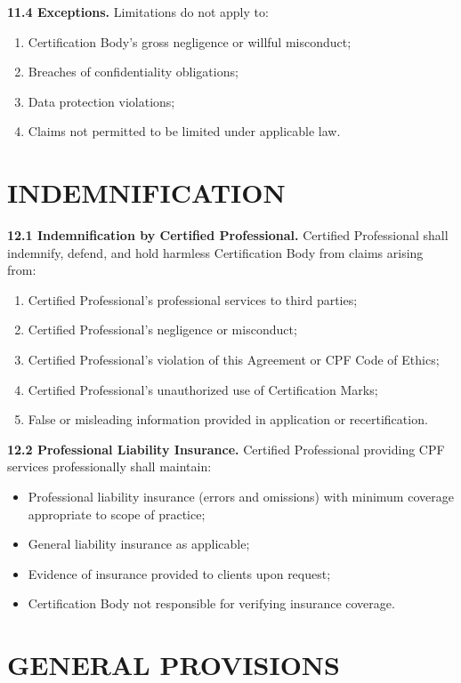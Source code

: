 \documentclass[11pt,a4paper]{article}
\begin{document}
\textbf{11.4 Exceptions.} Limitations do not apply to:

\begin{enumerate}[label=\alph*)]
\item Certification Body's gross negligence or willful misconduct;
\item Breaches of confidentiality obligations;
\item Data protection violations;
\item Claims not permitted to be limited under applicable law.
\end{enumerate}

\section{INDEMNIFICATION}

\textbf{12.1 Indemnification by Certified Professional.} Certified Professional shall indemnify, defend, and hold harmless Certification Body from claims arising from:

\begin{enumerate}[label=\alph*)]
\item Certified Professional's professional services to third parties;
\item Certified Professional's negligence or misconduct;
\item Certified Professional's violation of this Agreement or CPF Code of Ethics;
\item Certified Professional's unauthorized use of Certification Marks;
\item False or misleading information provided in application or recertification.
\end{enumerate}

\textbf{12.2 Professional Liability Insurance.} Certified Professional providing CPF services professionally shall maintain:

\begin{itemize}
\item Professional liability insurance (errors and omissions) with minimum coverage appropriate to scope of practice;
\item General liability insurance as applicable;
\item Evidence of insurance provided to clients upon request;
\item Certification Body not responsible for verifying insurance coverage.
\end{itemize}

\section{GENERAL PROVISIONS}
\end{document}
